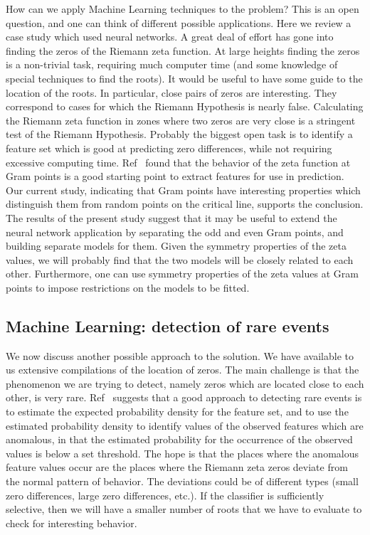 \documentclass[twoside]{article}
\theoremstyle{definition}
\begin{document}
{How can we apply Machine Learning techniques to the problem? This is an open question, and one can think of different possible applications. Here we review a case study which used neural networks. A great deal of effort has gone into finding the zeros of the Riemann zeta function. At large heights finding the zeros is a non-trivial task, requiring much computer time (and some knowledge of special techniques to find the roots). It would be useful to have some guide to the location of the roots. In particular, close pairs of zeros are interesting. They correspond to cases for which the
Riemann Hypothesis is nearly false. Calculating the Riemann zeta function in zones where
two zeros are very close is a stringent test of the Riemann Hypothesis. Probably the biggest open task is to identify a feature set which is good at predicting zero differences, while not requiring excessive computing time. Ref~\cite{osneural} found that the behavior of the zeta function at Gram points is a good starting point to extract features for use in prediction. Our current study, indicating that Gram points have interesting properties which distinguish them from random points on the critical line, supports the conclusion. The results of the present study suggest that it may be useful to extend the neural network application by separating the odd and even Gram points, and building separate models for them. Given the symmetry properties of the zeta values, we will probably find that the two models will be closely related to each other.  Furthermore, one can use symmetry properties of the zeta values at Gram points to impose restrictions on the models to be fitted.  


\subsection{\label{secMLrare}Machine Learning: detection of rare events}


We now discuss another possible approach to the solution. We have available to us extensive compilations of the location of zeros. The main challenge is that the phenomenon we are trying to detect, namely zeros which are located close to each other, is very rare. 
Ref~\cite{Friedman(2001)} suggests that  a good approach to detecting rare events is to estimate the expected probability density for the feature set, and to use the estimated probability density to identify values of the observed features which are anomalous, in that the estimated probability for the occurrence of the observed values is below a set threshold. The hope is that the places where the anomalous feature values occur are the places where the Riemann zeta zeros deviate from the normal pattern of behavior. The deviations could be of different types (small zero differences, large zero differences, etc.). If the classifier is sufficiently selective, then we will have a smaller number of roots that we have to evaluate to check for interesting behavior. 


}
\end{document}
